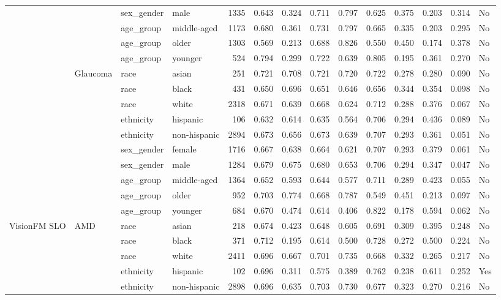 \begin{longtable}{@{}lll l rrrrrrrr@{}}
 &  & sex\_gender & male & 1335 & 0.643 & 0.324 & 0.711 & 0.797 & 0.625 & 0.375 & 0.203 & 0.314 & No \\
 &  & age\_group & middle-aged & 1173 & 0.680 & 0.361 & 0.731 & 0.797 & 0.665 & 0.335 & 0.203 & 0.295 & No \\
 &  & age\_group & older & 1303 & 0.569 & 0.213 & 0.688 & 0.826 & 0.550 & 0.450 & 0.174 & 0.378 & No \\
 &  & age\_group & younger & 524 & 0.794 & 0.299 & 0.722 & 0.639 & 0.805 & 0.195 & 0.361 & 0.270 & No \\
 & Glaucoma & race & asian & 251 & 0.721 & 0.708 & 0.721 & 0.720 & 0.722 & 0.278 & 0.280 & 0.090 & No \\
 &  & race & black & 431 & 0.650 & 0.696 & 0.651 & 0.646 & 0.656 & 0.344 & 0.354 & 0.098 & No \\
 &  & race & white & 2318 & 0.671 & 0.639 & 0.668 & 0.624 & 0.712 & 0.288 & 0.376 & 0.067 & No \\
 &  & ethnicity & hispanic & 106 & 0.632 & 0.614 & 0.635 & 0.564 & 0.706 & 0.294 & 0.436 & 0.089 & No \\
 &  & ethnicity & non-hispanic & 2894 & 0.673 & 0.656 & 0.673 & 0.639 & 0.707 & 0.293 & 0.361 & 0.051 & No \\
 &  & sex\_gender & female & 1716 & 0.667 & 0.638 & 0.664 & 0.621 & 0.707 & 0.293 & 0.379 & 0.061 & No \\
 &  & sex\_gender & male & 1284 & 0.679 & 0.675 & 0.680 & 0.653 & 0.706 & 0.294 & 0.347 & 0.047 & No \\
 &  & age\_group & middle-aged & 1364 & 0.652 & 0.593 & 0.644 & 0.577 & 0.711 & 0.289 & 0.423 & 0.055 & No \\
 &  & age\_group & older & 952 & 0.703 & 0.774 & 0.668 & 0.787 & 0.549 & 0.451 & 0.213 & 0.097 & No \\
 &  & age\_group & younger & 684 & 0.670 & 0.474 & 0.614 & 0.406 & 0.822 & 0.178 & 0.594 & 0.062 & No \\
VisionFM SLO & AMD & race & asian & 218 & 0.674 & 0.423 & 0.648 & 0.605 & 0.691 & 0.309 & 0.395 & 0.248 & No \\
 &  & race & black & 371 & 0.712 & 0.195 & 0.614 & 0.500 & 0.728 & 0.272 & 0.500 & 0.224 & No \\
 &  & race & white & 2411 & 0.696 & 0.667 & 0.701 & 0.735 & 0.668 & 0.332 & 0.265 & 0.217 & No \\
 &  & ethnicity & hispanic & 102 & 0.696 & 0.311 & 0.575 & 0.389 & 0.762 & 0.238 & 0.611 & 0.252 & Yes \\
 &  & ethnicity & non-hispanic & 2898 & 0.696 & 0.635 & 0.703 & 0.730 & 0.677 & 0.323 & 0.270 & 0.216 & No \\

\end{longtable}
